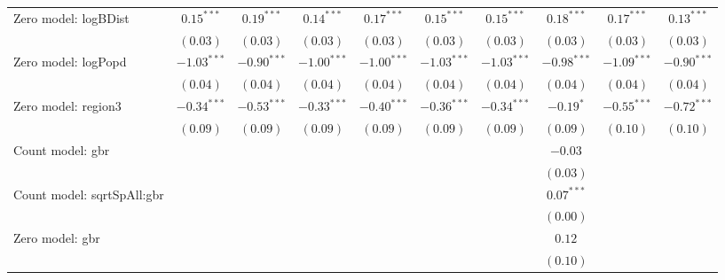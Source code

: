 \begin{sidewaystable}
\begin{center}
{\begin{tabular}{l c c c c c c c c c}
Zero model: logBDist           & $0.15^{***}$   & $0.19^{***}$  & $0.14^{***}$  & $0.17^{***}$  & $0.15^{***}$  & $0.15^{***}$   & $0.18^{***}$  & $0.17^{***}$   & $0.13^{***}$  \\
                               & $(0.03)$       & $(0.03)$      & $(0.03)$      & $(0.03)$      & $(0.03)$      & $(0.03)$       & $(0.03)$      & $(0.03)$       & $(0.03)$      \\
Zero model: logPopd            & $-1.03^{***}$  & $-0.90^{***}$ & $-1.00^{***}$ & $-1.00^{***}$ & $-1.03^{***}$ & $-1.03^{***}$  & $-0.98^{***}$ & $-1.09^{***}$  & $-0.90^{***}$ \\
                               & $(0.04)$       & $(0.04)$      & $(0.04)$      & $(0.04)$      & $(0.04)$      & $(0.04)$       & $(0.04)$      & $(0.04)$       & $(0.04)$      \\
Zero model: region3            & $-0.34^{***}$  & $-0.53^{***}$ & $-0.33^{***}$ & $-0.40^{***}$ & $-0.36^{***}$ & $-0.34^{***}$  & $-0.19^{*}$   & $-0.55^{***}$  & $-0.72^{***}$ \\
                               & $(0.09)$       & $(0.09)$      & $(0.09)$      & $(0.09)$      & $(0.09)$      & $(0.09)$       & $(0.09)$      & $(0.10)$       & $(0.10)$      \\
Count model: gbr               &                &               &               &               &               &                & $-0.03$       &                &               \\
                               &                &               &               &               &               &                & $(0.03)$      &                &               \\
Count model: sqrtSpAll:gbr     &                &               &               &               &               &                & $0.07^{***}$  &                &               \\
                               &                &               &               &               &               &                & $(0.00)$      &                &               \\
Zero model: gbr                &                &               &               &               &               &                & $0.12$        &                &               \\
                               &                &               &               &               &               &                & $(0.10)$      &                &               \\

\end{tabular}}
\end{center}
\end{sidewaystable}
